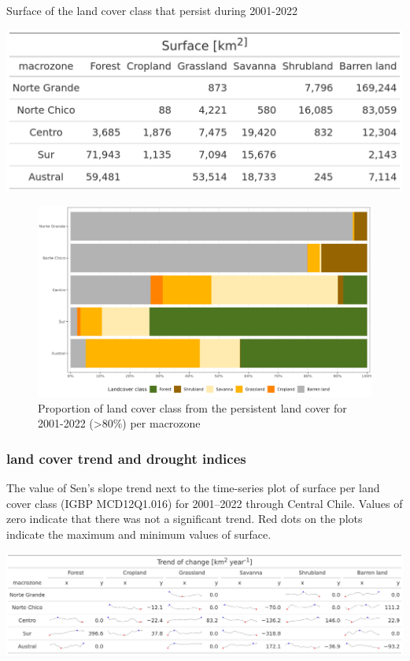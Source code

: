 \documentclass[
  authoryear,
  preprint,
  3p,
  onecolumn]{elsarticle}
\begin{document}
\begin{table}[!ht]
\caption{Surface of the land cover class that persist during 2001-2022}
\label{tab-land coverSurf}
\includegraphics[width = .5\textwidth]{../output/figs/table_surface_landcover_macrozone.png}
\end{table}

\begin{figure}[!ht]

{\centering \includegraphics{../output/figs/LC_pers80_per_macrozone.png}

}

\caption{\label{fig-LCprop}Proportion of land cover class from the
persistent land cover for 2001-2022 (\textgreater80\%) per macrozone}

\end{figure}

\hypertarget{land-cover-trend-and-drought-indices-1}{%
\subsubsection{land cover trend and drought
indices}\label{land-cover-trend-and-drought-indices-1}}

\begin{table}[!ht]
\caption{The value of Sen's slope trend next to the time-series plot of surface per land cover class (IGBP MCD12Q1.016) for 2001–2022 through Central Chile. Values of zero indicate that there was not a significant trend. Red dots on the plots indicate the maximum and minimum values of surface.}
\label{tab-land coverTrend}
\includegraphics[]{../output/figs/table_var_landcover_macro.png}
\end{table}
\end{document}
